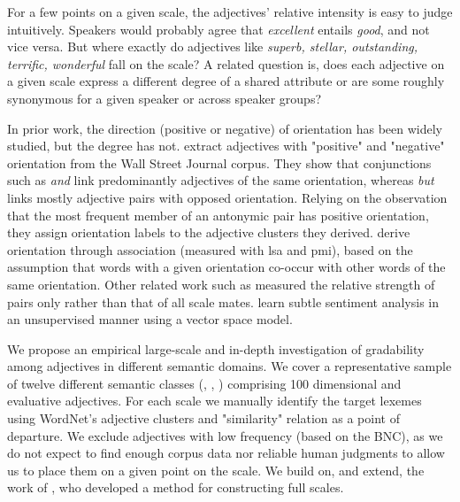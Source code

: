 \documentclass[10pt]{article}
\begin{document}
For a few points on a given scale, the adjectives'
relative intensity is easy to judge intuitively. Speakers would probably agree that 
\textit{excellent} entails \textit{good}, and not vice versa.  But where exactly do 
adjectives like \textit{superb, stellar, outstanding, terrific, wonderful} fall 
on the scale? A related question is, does each adjective on a given scale 
express a different degree of a shared attribute or are some roughly synonymous for a given speaker 
or across speaker groups? 

In prior work, the direction (positive or negative) of orientation has been widely studied, 
but the degree has not. \cite{hatzivassiloglou1997predicting} extract adjectives 
with "positive" and "negative" orientation from the Wall Street Journal corpus. They show 
that conjunctions such as {\it and}
 link predominantly adjectives of the 
same orientation, whereas {\it but} links mostly adjective pairs with opposed orientation. 
Relying on the observation that the most frequent member of an 
antonymic pair has positive orientation, they assign orientation labels to the adjective 
clusters they derived. \cite{turney2003measuring} derive orientation through association 
(measured with {\sc lsa} and {\sc pmi}), based on the assumption that words with a given 
orientation co-occur with other words of the same orientation. Other related work such as 
\cite{chklovski2004verbocean} measured the relative strength of 
pairs only rather than that of all scale mates. \cite{maasmulti} learn subtle sentiment analysis 
in an unsupervised manner using a vector space model. 


We propose an empirical large-scale and in-depth investigation of gradability among adjectives 
in different semantic domains. We cover a representative sample of twelve different semantic classes 
(\cite{bierwisch1989semantics}, \cite{frawley1992linguistic}, \cite{dixon1982have}) comprising 100 
dimensional and evaluative adjectives.  For each scale we manually identify the target lexemes using WordNet's adjective 
clusters and "similarity" relation as a point of departure. We exclude adjectives with low frequency (based on the 
BNC), as we do not expect to find enough corpus data nor reliable human judgments to 
allow us to place them on a given point on the scale. We build on, and extend, the work of \cite{sheinman2009adjscales}, who
developed a method for constructing full scales. 
\end{document}
